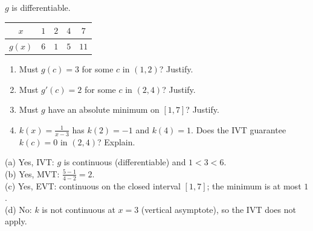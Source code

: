 \begin{exo}{}
$g$ is differentiable. \;\begin{tabular}{|c|c|c|c|c|}\hline$x$&$1$&$2$&$4$&$7$\\\hline$g(x)$&$6$&$1$&$5$&$11$\\\hline\end{tabular}
\begin{enumerate}[label=(\alph*)]
\item Must $g(c)=3$ for some $c$ in $(1,2)$? Justify.
\item Must $g'(c)=2$ for some $c$ in $(2,4)$? Justify.
\item Must $g$ have an absolute minimum on $[1,7]$? Justify.
\item $k(x)=\frac{1}{x-3}$ has $k(2)=-1$ and $k(4)=1$. Does the IVT guarantee $k(c)=0$ in $(2,4)$? Explain.
\end{enumerate}
\work{5cm}
\begin{solution}
(a) Yes, IVT: $g$ is continuous (differentiable) and $1<3<6$.\\
(b) Yes, MVT: $\frac{5-1}{4-2}=2$.\\
(c) Yes, EVT: continuous on the closed interval $[1,7]$; the minimum is at most $1$.\\
(d) No: $k$ is not continuous at $x=3$ (vertical asymptote), so the IVT does not apply.
\end{solution}
\end{exo}

